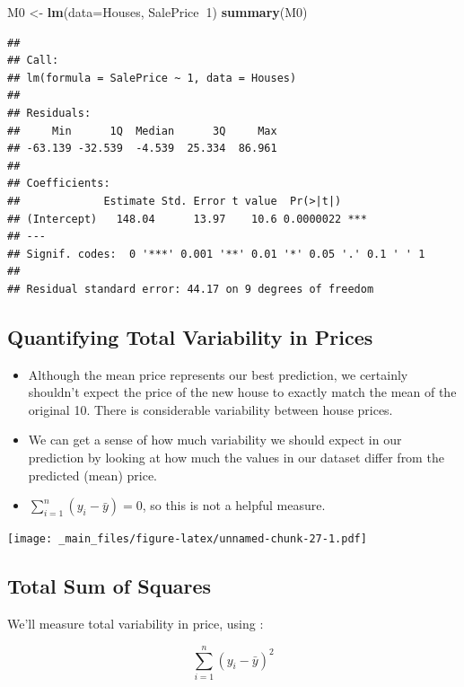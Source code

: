 \documentclass[]{book}
\newenvironment{Shaded}{\begin{snugshade}}{\end{snugshade}}
\newcommand{\KeywordTok}[1]{\textcolor[rgb]{0.13,0.29,0.53}{\textbf{#1}}}
\newcommand{\DataTypeTok}[1]{\textcolor[rgb]{0.13,0.29,0.53}{#1}}
\newcommand{\DecValTok}[1]{\textcolor[rgb]{0.00,0.00,0.81}{#1}}
\newcommand{\StringTok}[1]{\textcolor[rgb]{0.31,0.60,0.02}{#1}}
\newcommand{\OperatorTok}[1]{\textcolor[rgb]{0.81,0.36,0.00}{\textbf{#1}}}
\newcommand{\NormalTok}[1]{#1}
\begin{document}
\begin{Shaded}
\begin{Highlighting}[]
\NormalTok{M0 <-}\StringTok{ }\KeywordTok{lm}\NormalTok{(}\DataTypeTok{data=}\NormalTok{Houses, SalePrice}\OperatorTok{~}\DecValTok{1}\NormalTok{)}
\KeywordTok{summary}\NormalTok{(M0)}
\end{Highlighting}
\end{Shaded}

\begin{verbatim}
## 
## Call:
## lm(formula = SalePrice ~ 1, data = Houses)
## 
## Residuals:
##     Min      1Q  Median      3Q     Max 
## -63.139 -32.539  -4.539  25.334  86.961 
## 
## Coefficients:
##             Estimate Std. Error t value  Pr(>|t|)    
## (Intercept)   148.04      13.97    10.6 0.0000022 ***
## ---
## Signif. codes:  0 '***' 0.001 '**' 0.01 '*' 0.05 '.' 0.1 ' ' 1
## 
## Residual standard error: 44.17 on 9 degrees of freedom
\end{verbatim}

\subsection{Quantifying Total Variability in
Prices}\label{quantifying-total-variability-in-prices}

\begin{itemize}
\item
  Although the mean price represents our best prediction, we certainly
  shouldn't expect the price of the new house to exactly match the mean
  of the original 10. There is considerable variability between house
  prices.
\item
  We can get a sense of how much variability we should expect in our
  prediction by looking at how much the values in our dataset differ
  from the predicted (mean) price.
\item
  \(\displaystyle\sum_{i=1}^n (y_i - \bar{y})=0\), so this is not a
  helpful measure.
\end{itemize}

\texttt{[image: \_main\_files/figure-latex/unnamed-chunk-27-1.pdf]}

\subsection{Total Sum of Squares}\label{total-sum-of-squares}

We'll measure total variability in price, using :

\[
\displaystyle\sum_{i=1}^n (y_i - \bar{y})^2
\]
\end{document}
